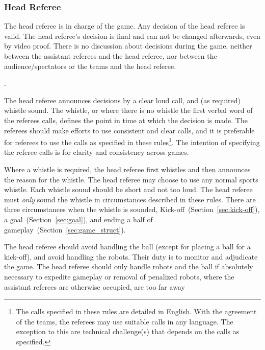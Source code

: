 

\subsubsection{Head Referee}
\label{sec:head_referee}

The head referee is in charge of the game. Any decision of the head referee is valid. The head referee's decision is final and can not be changed afterwards, even by video proof. There is no discussion about decisions during the game, neither between the assistant referees and the head referee, nor between the audience/spectators or the teams and the head referee.

.

The head referee announces decisions by a clear loud call, and (as required) whistle sound.
The whistle, or where there is no whistle the first verbal word of the referees calls, defines the point in time at which the decision is made.
The referees should make efforts to use consistent and clear calls, and it is preferable for referees to use the calls as specified in these rules\footnote{The calls specified in these rules are detailed in English. With the agreement of the teams, the referees may use suitable calls in any language. The exception to this are technical challenge(s) that depends on the calls as specified.}.
The intention of specifying the referee calls is for clarity and consistency across games.

Where a whistle is required, the head referee first whistles and then announces the reason for the whistle.
The head referee may choose to use any normal sports whistle.
Each whistle sound should be short and not too loud.
The head referee must \textit{only} sound the whistle in circumstances described in these rules.
There are three circumstances when the whistle is sounded, Kick-off~(\cf Section~\ref{sec:kick-off}), a goal~(\cf Section~\ref{sec:goal}), and ending a half of gameplay~(\cf Section~\ref{sec:game_struct}).

The head referee should avoid handling the ball (except for placing a ball for a kick-off), and avoid handling the robots.
Their duty is to monitor and adjudicate the game.
The head referee should only handle robots and the ball if absolutely necessary to expedite gameplay or removal of penalized robots, where the assistant referees are otherwise occupied, are too far away 

